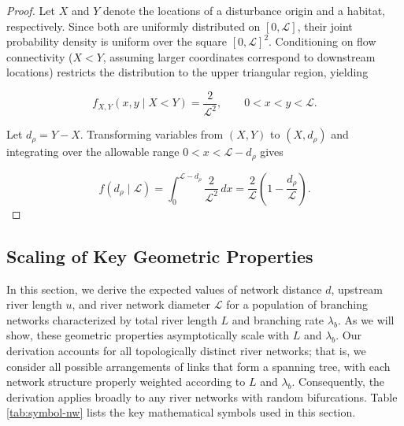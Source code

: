 \documentclass[11pt, class=article, crop=false]{standalone}
\theoremstyle{definition}
\begin{document}
\begin{proof}
Let $X$ and $Y$ denote the locations of a disturbance origin and a habitat, respectively. 
Since both are uniformly distributed on $[0,\mathcal{L}]$, their joint probability density is uniform over the square $[0,\mathcal{L}]^2$. 
Conditioning on flow connectivity ($X<Y$, assuming larger coordinates correspond to downstream locations) restricts the distribution to the upper triangular region, yielding

\[
f_{X,Y}(x,y\mid X<Y)
=
\frac{2}{\mathcal{L}^2},
\qquad
0<x<y<\mathcal{L}.
\]

Let $d_{\rho} = Y-X$. 
Transforming variables from $(X,Y)$ to $(X,d_{\rho})$ and integrating over the allowable range $0<x<\mathcal{L}-d_{\rho}$ gives

\begin{equation}
    f(d_{\rho} \mid \mathcal{L})
    =
    \int_0^{\mathcal{L}-d_{\rho}}
    \frac{2}{\mathcal{L}^2}\,dx
    =
    \frac{2}{\mathcal{L}}
    \left(
    1-\frac{d_{\rho}}{\mathcal{L}}
    \right).
\end{equation}

\end{proof}

\newpage

\subsection{Scaling of Key Geometric Properties} \label{updist}

In this section, we derive the expected values of network distance $d$, upstream river length $u$, and river network diameter $\mathcal{L}$ for a population of branching networks characterized by total river length $L$ and branching rate $\lambda_b$.
As we will show, these geometric properties asymptotically scale with $L$ and $\lambda_b$.
Our derivation accounts for all topologically distinct river networks; that is, we consider all possible arrangements of links that form a spanning tree, with each network structure properly weighted according to $L$ and $\lambda_b$.
Consequently, the derivation applies broadly to any river networks with random bifurcations. 
Table \ref{tab:symbol-nw} lists the key mathematical symbols used in this section.
\end{document}
